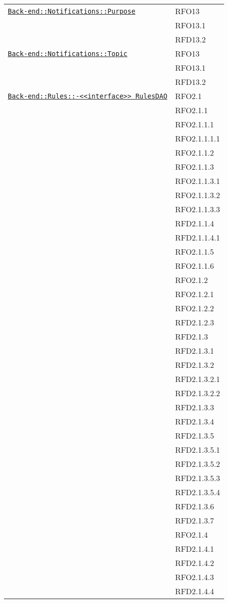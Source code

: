 \begin{longtable}{|>{\centering}m{10cm}|m{3cm}<{\centering}|}
\hyperref[Back-end::Notifications::Purpose]{\texttt{Back-end::Notifications::Purpose}} & RFO13\\
& RFO13.1\\
& RFD13.2\\ \hline

\hyperref[Back-end::Notifications::Topic]{\texttt{Back-end::Notifications::Topic}} & RFO13\\
& RFO13.1\\
& RFD13.2\\ \hline

\hyperref[Back-end::Rules::<<interface>> RulesDAO]{\texttt{Back-end::Rules::-\linebreak <<interface>> RulesDAO}} & RFO2.1\\
& RFO2.1.1\\
& RFO2.1.1.1\\
& RFO2.1.1.1.1\\
& RFO2.1.1.2\\
& RFO2.1.1.3\\
& RFO2.1.1.3.1\\
& RFO2.1.1.3.2\\
& RFO2.1.1.3.3\\
& RFD2.1.1.4\\
& RFD2.1.1.4.1\\
& RFO2.1.1.5\\
& RFO2.1.1.6\\
& RFO2.1.2\\
& RFO2.1.2.1\\
& RFO2.1.2.2\\
& RFD2.1.2.3\\
& RFD2.1.3\\
& RFD2.1.3.1\\
& RFD2.1.3.2\\
& RFD2.1.3.2.1\\
& RFD2.1.3.2.2\\
& RFD2.1.3.3\\
& RFD2.1.3.4\\
& RFD2.1.3.5\\
& RFD2.1.3.5.1\\
& RFD2.1.3.5.2\\
& RFD2.1.3.5.3\\
& RFD2.1.3.5.4\\
& RFD2.1.3.6\\
& RFD2.1.3.7\\
& RFO2.1.4\\
& RFD2.1.4.1\\
& RFD2.1.4.2\\
& RFO2.1.4.3\\
& RFD2.1.4.4\\ \hline


\end{longtable}

